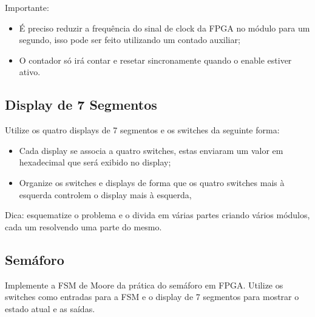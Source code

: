\documentclass[a4paper]{article}
\begin{document}
Importante: 

\begin{itemize}
	\item É preciso reduzir a frequência do sinal de clock da FPGA no módulo para um segundo, isso pode ser feito utilizando um contado auxiliar;
    \item O contador só irá contar e resetar sincronamente quando o enable estiver ativo.

\end{itemize}

\subsection*{Display de 7 Segmentos}
Utilize os quatro displays de 7 segmentos e os switches da seguinte forma:

\begin{itemize}
	\item Cada display se associa a quatro switches, estas enviaram um valor em hexadecimal que será exibido no display;
    \item Organize os switches e displays de forma que os quatro switches mais à esquerda controlem o display mais à esquerda,
\end{itemize}

Dica: esquematize o problema e o divida em várias partes criando vários módulos, cada um resolvendo uma parte do mesmo.

\subsection*{Semáforo}
Implemente a FSM de Moore da prática do semáforo em FPGA. Utilize os switches como entradas para a FSM e o display de 7 segmentos para mostrar o estado atual e as saídas.
\end{document}
